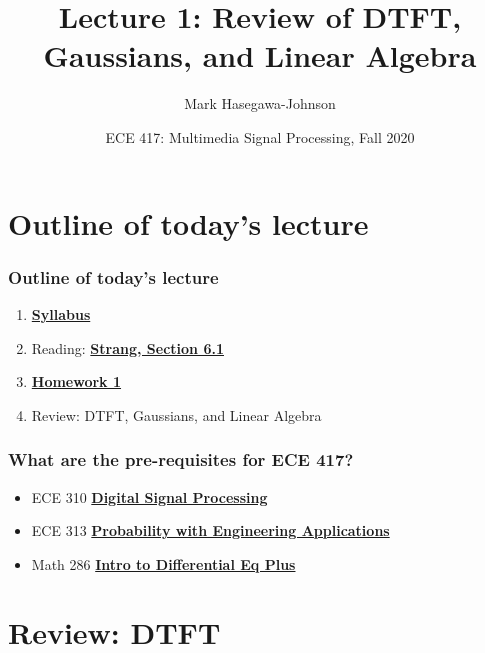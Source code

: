 \documentclass{beamer}
\title{Lecture 1: Review of DTFT, Gaussians, and Linear Algebra}
\author{Mark Hasegawa-Johnson}
\date{ECE 417: Multimedia Signal Processing, Fall 2020}
\begin{document}
\begin{frame}
  \maketitle
\end{frame}

\begin{frame}
  \tableofcontents
\end{frame}

\section[Outline]{Outline of today's lecture}
\setcounter{subsection}{1}
\begin{frame}
  \frametitle{Outline of today's lecture}
  \begin{enumerate}
  \item \href{https://courses.engr.illinois.edu/ece417/fa2020/\#syllabus}{\bf\color{blue}Syllabus}
  \item Reading: \href{http://math.mit.edu/~gs/linearalgebra/linearalgebra5_6-1.pdf}{\bf\color{blue}Strang, Section 6.1}
  \item \href{https://courses.engr.illinois.edu/ece417/fa2020/hw1.pdf}{\bf\color{blue}Homework 1}
  \item Review: DTFT, Gaussians, and Linear Algebra
  \end{enumerate}
\end{frame}

\begin{frame}
  \frametitle{What are the pre-requisites for ECE 417?}
  \begin{itemize}
  \item ECE 310 \href{https://courses.grainger.illinois.edu/ece310/fa2020/}{\bf\color{blue}Digital Signal Processing}
  \item ECE 313 \href{https://courses.grainger.illinois.edu/ece313/fa2020/}{\bf\color{blue}Probability with Engineering Applications}
  \item Math 286 \href{https://netmath.illinois.edu/college/math-286}{\bf\color{blue}Intro to Differential Eq Plus}
  \end{itemize}
\end{frame}

\section[DTFT]{Review: DTFT}
\setcounter{subsection}{1}
\end{document}

